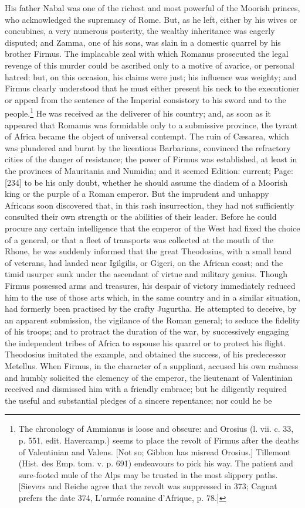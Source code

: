 His father Nabal was one of the richest and most powerful of the Moorish princes, who acknowledged the supremacy of Rome. But, as he left, either by his wives or concubines, a very numerous posterity, the wealthy inheritance was eagerly disputed; and Zamma, one of his sons, was slain in a domestic quarrel by his brother Firmus. The implacable zeal with which Romanus prosecuted the legal revenge of this murder could be ascribed only to a motive of avarice, or personal hatred: but, on this occasion, his claims were just; his influence was weighty; and Firmus clearly understood that he must either present his neck to the executioner or appeal from the sentence of the Imperial consistory to his sword and to the people.\footnote{The chronology of Ammianus is loose and obscure: and Orosius (l. vii. c. 33, p. 551, edit. Havercamp.) seems to place the revolt of Firmus after the deaths of Valentinian and Valens. [Not so; Gibbon has misread Orosius.] Tillemont (Hist. des Emp. tom. v. p. 691) endeavours to pick his way. The patient and sure-footed mule of the Alps may be trusted in the most slippery paths. [Sievers and Reiche agree that the revolt was suppressed in 373; Cagnat prefers the date 374, L\texthebrew{}’armée romaine d\texthebrew{}’Afrique, p. 78.]} He was received as the deliverer of his country; and, as soon as it appeared that Romanus was formidable only to a submissive province, the tyrant of Africa became the object of universal contempt. The ruin of Cæsarea, which was plundered and burnt by the licentious Barbarians, convinced the refractory cities of the danger of resistance; the power of Firmus was established, at least in the provinces of Mauritania and Numidia; and it seemed Edition: current; Page: [234] to be his only doubt, whether he should assume the diadem of a Moorish king or the purple of a Roman emperor. But the imprudent and unhappy Africans soon discovered that, in this rash insurrection, they had not sufficiently consulted their own strength or the abilities of their leader. Before he could procure any certain intelligence that the emperor of the West had fixed the choice of a general, or that a fleet of transports was collected at the mouth of the Rhone, he was suddenly informed that the great Theodosius, with a small band of veterans, had landed near Igilgilis, or Gigeri, on the African coast; and the timid usurper sunk under the ascendant of virtue and military genius. Though Firmus possessed arms and treasures, his despair of victory immediately reduced him to the use of those arts which, in the same country and in a similar situation, had formerly been practised by the crafty Jugurtha. He attempted to deceive, by an apparent submission, the vigilance of the Roman general; to seduce the fidelity of his troops; and to protract the duration of the war, by successively engaging the independent tribes of Africa to espouse his quarrel or to protect his flight. Theodosius imitated the example, and obtained the success, of his predecessor Metellus. When Firmus, in the character of a suppliant, accused his own rashness and humbly solicited the clemency of the emperor, the lieutenant of Valentinian received and dismissed him with a friendly embrace; but he diligently required the useful and substantial pledges of a sincere repentance; nor could he be 